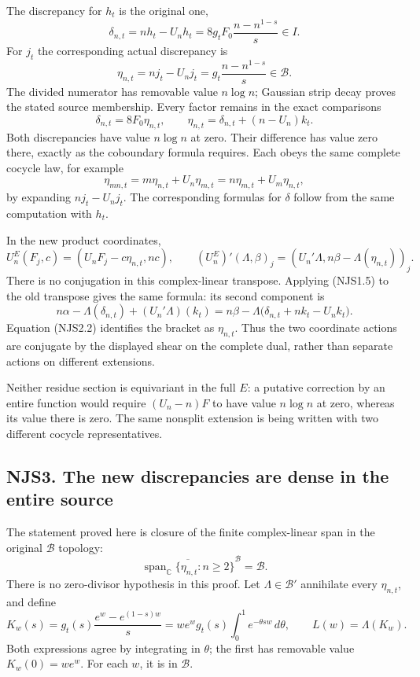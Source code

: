 The discrepancy for \(h_t\) is the original one, \[
\delta_{n,t}=nh_t-U_nh_t
=8g_tF_0\frac{n-n^{1-s}}s\in I.
\] For \(j_t\) the corresponding actual discrepancy is \[
\eta_{n,t}=nj_t-U_nj_t
=g_t\frac{n-n^{1-s}}s\in\mathcal B.
\tag{NJS2.1}
\] The divided numerator has removable value \(n\log n\); Gaussian strip
decay proves the stated source membership. Every factor remains in the
exact comparisons \[
\boxed{\delta_{n,t}=8F_0\eta_{n,t},\qquad
\eta_{n,t}=\delta_{n,t}+(n-U_n)k_t.}
\tag{NJS2.2}
\] Both discrepancies have value \(n\log n\) at zero. Their difference
has value zero there, exactly as the coboundary formula requires. Each
obeys the same complete cocycle law, for example \[
\eta_{mn,t}=m\eta_{n,t}+U_n\eta_{m,t}
=n\eta_{m,t}+U_m\eta_{n,t},
\tag{NJS2.3}
\] by expanding \(nj_t-U_nj_t\). The corresponding formulas for
\(\delta\) follow from the same computation with \(h_t\).

In the new product coordinates, \[
U_n^E(F_j,c)=(U_nF_j-c\eta_{n,t},nc),
\qquad
(U_n^E)'(\Lambda,\beta)_j
=(U_n'\Lambda,n\beta-\Lambda(\eta_{n,t}))_j.
\tag{NJS2.4}
\] There is no conjugation in this complex-linear transpose. Applying
(NJS1.5) to the old transpose gives the same formula: its second
component is \[
n\alpha-\Lambda(\delta_{n,t})+(U_n'\Lambda)(k_t)
=n\beta-\Lambda\bigl(\delta_{n,t}+nk_t-U_nk_t\bigr).
\] Equation (NJS2.2) identifies the bracket as \(\eta_{n,t}\). Thus the
two coordinate actions are conjugate by the displayed shear on the
complete dual, rather than separate actions on different extensions.

Neither residue section is equivariant in the full \(E\): a putative
correction by an entire function would require \((U_n-n)F\) to have
value \(n\log n\) at zero, whereas its value there is zero. The same
nonsplit extension is being written with two different cocycle
representatives.

\subsection{NJS3. The new discrepancies are dense in the entire
source}\label{njs3.-the-new-discrepancies-are-dense-in-the-entire-source}

The statement proved here is closure of the finite complex-linear span
in the original \(\mathcal B\) topology: \[
\boxed{\overline{\operatorname{span}_{\mathbb C}
\{\eta_{n,t}:n\ge2\}}^{\mathcal B}=\mathcal B.}
\tag{NJS3.1}
\] There is no zero-divisor hypothesis in this proof. Let
\(\Lambda\in\mathcal B'\) annihilate every \(\eta_{n,t}\), and define \[
K_w(s)=g_t(s)\frac{e^w-e^{(1-s)w}}s
=we^wg_t(s)\int_0^1e^{-\theta sw}\,d\theta,
\qquad L(w)=\Lambda(K_w).
\tag{NJS3.2}
\] Both expressions agree by integrating in \(\theta\); the first has
removable value \(K_w(0)=we^w\). For each \(w\), it is in
\(\mathcal B\).


